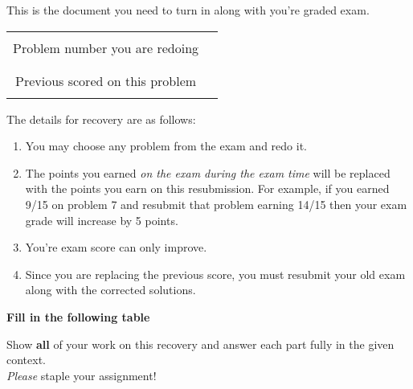 \documentclass[11pt]{article}
\begin{document}
\pagestyle{fancy} 

This is the document you need to turn in along with you're graded exam. 

\begin{table}[h]
   \centering
   \begin{tabular}{c >{\centering}m{5cm} }
      \hline 
       & \\
      Problem number you are redoing & \\
       & \\
       & \\
      Previous scored on this problem & \\
       & \\
      \hline 
   \end{tabular}
\end{table}

The details for recovery are as follows:
\begin{enumerate}
   \item You may choose any problem from the exam and redo it.
   \item The points you earned \textit{on the exam during the exam time} will be replaced with the points you earn on this resubmission.
      For example, if you earned 9/15 on problem 7 and resubmit that problem earning 14/15 then your exam grade will increase by 5 points.

   \item You're exam score can only improve.

   \item Since you are replacing the previous score, you must resubmit your old exam along with the corrected solutions.
      
\end{enumerate}

\textbf{Fill in the following table}

Show \textbf{all} of your work on this recovery and answer each part fully in the given context. \\

\emph{Please} staple your assignment! \\
\end{document}
